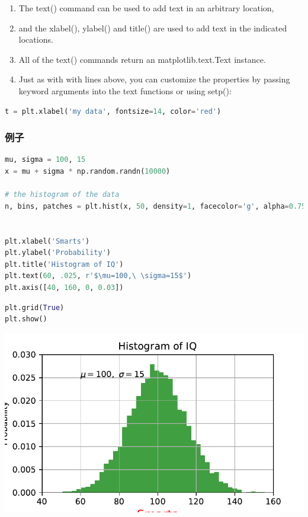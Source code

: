 \documentclass[UTF8,a4paper,12pt]{ctexart}  %
\providecommand{\tightlist}{\setlength{\itemsep}{0pt}\setlength{\parskip}{0pt}}
\begin{document}
\begin{enumerate}
\def\labelenumi{\arabic{enumi}.}
\tightlist
\item
  The text() command can be used to add text in an arbitrary location,
\item
  and the xlabel(), ylabel() and title() are used to add text in the
  indicated locations.
\item
  All of the text() commands return an matplotlib.text.Text instance.
\item
  Just as with with lines above, you can customize the properties by
  passing keyword arguments into the text functions or using setp():
\end{enumerate}

\begin{lstlisting}[language=Python]
t = plt.xlabel('my data', fontsize=14, color='red')
\end{lstlisting}

\hypertarget{ux4f8bux5b50-1}{%
\subsubsection{例子}\label{ux4f8bux5b50-1}}

\begin{lstlisting}[language=Python]
mu, sigma = 100, 15
x = mu + sigma * np.random.randn(10000)

# the histogram of the data
n, bins, patches = plt.hist(x, 50, density=1, facecolor='g', alpha=0.75)


plt.xlabel('Smarts')
plt.ylabel('Probability')
plt.title('Histogram of IQ')
plt.text(60, .025, r'$\mu=100,\ \sigma=15$')
plt.axis([40, 160, 0, 0.03])
\end{lstlisting}

\begin{lstlisting}[language=Python]
plt.grid(True)
plt.show()
\end{lstlisting}

\begin{center}\includegraphics[width=0.9\linewidth]{python-visualization_files/figure-latex/unnamed-chunk-17-1} \end{center}
\end{document}
